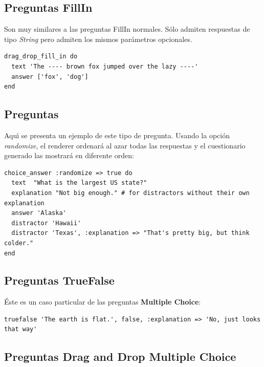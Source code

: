 \subsection{Preguntas  FillIn}
\label{subsec:Apendice2.2}

Son muy similares a las preguntas FillIn normales. S\'olo admiten respuestas de tipo \textit{String} pero admiten los mismos par\'ametros opcionales.
\begin{verbatim}
drag_drop_fill_in do
  text 'The ---- brown fox jumped over the lazy ----'
  answer ['fox', 'dog']
end
\end{verbatim}

\subsection{Preguntas }
\label{subsec:Apendice2.3}

Aqu\'{\i} se presenta un ejemplo de este tipo de pregunta. Usando la opci\'on \textit{randomize}, el renderer ordenar\'a al azar todas las respuestas
y el cuestionario generado las mostrar\'a en diferente orden:
\begin{verbatim}
choice_answer :randomize => true do
  text  "What is the largest US state?"
  explanation "Not big enough." # for distractors without their own explanation
  answer 'Alaska'
  distractor 'Hawaii'
  distractor 'Texas', :explanation => "That's pretty big, but think colder."
end
\end{verbatim}

\subsection{Preguntas TrueFalse}
\label{subsec:Apendice2.4}

\'Este es un caso particular de las preguntas {\bfseries Multiple Choice}:
\begin{verbatim}
truefalse 'The earth is flat.', false, :explanation => 'No, just looks that way'
\end{verbatim}

\subsection{Preguntas Drag and Drop Multiple Choice}
\label{subsec:Apendice2.5}

